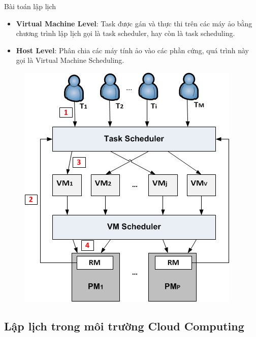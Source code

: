 \documentclass[11pt,xcolor={dvipsnames}, aspectratio=169]{beamer}
\begin{document}
\begin{frame}

\begin{minipage}[t]{0.48\linewidth}
\begin{block}{Bài toán lập lịch}
\begin{itemize}
    \item \textbf{Virtual Machine Level}: Task được gán và thực thi trên các máy ảo bằng chương trình lập lịch gọi là task scheduler, hay còn là task scheduling.
    \item \textbf{Host Level}: Phân chia các máy tính ảo vào các phần cứng, quá trình này gọi là Virtual Machine Scheduling. 
\end{itemize}
\end{block}
\end{minipage}
\hfill
\begin{minipage}[t]{0.48\linewidth}
	\begin{figure}
		\centering
		\includegraphics[scale=0.3]{images/scheduling_types.jpg}
	\end{figure}
\end{minipage}
\end{frame}

\subsection{Lập lịch trong môi trường Cloud Computing}
\end{document}
